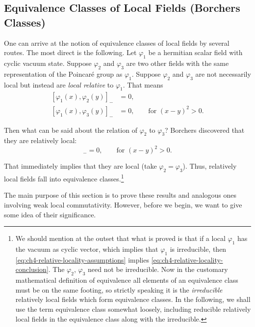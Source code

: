 \subsection{Equivalence Classes of Local Fields (Borchers Classes)}
\label{sec:ch4-6-borchers-classes}

One can arrive at the notion of equivalence classes of local fields by
several routes. The most direct is the following. Let $\varphi_1$ be a
hermitian scalar field with cyclic vacuum state. Suppose $\varphi_2$ and
$\varphi_3$ are two other fields with the same representation of the
Poincaré group as $\varphi_1$. Suppose $\varphi_2$ and $\varphi_3$ are not
necessarily local but instead are \emph{local relative} to $\varphi_1$. That
means
\begin{equation}
\begin{aligned}
  [\varphi_1(x),\varphi_2(y)]_-&=0,\\
  [\varphi_1(x),\varphi_3(y)]_-&=0,
  \qquad \text{for }(x-y)^2>0.
\end{aligned}
\tag{4-90}\label{eq:ch4-relative-locality-assumptions}
\end{equation}

Then what can be said about the relation of $\varphi_2$ to $\varphi_3$?
Borchers discovered that they are relatively local:
\begin{equation}
  [\varphi_2(x),\varphi_3(y)]_-=0,
  \qquad \text{for }(x-y)^2>0.
\tag{4-91}\label{eq:ch4-relative-locality-conclusion}
\end{equation}

That immediately implies that they are local (take $\varphi_2=\varphi_3$).
Thus, relatively local fields fall into equivalence classes.\footnote{%
We should mention at the outset that what is proved is that if a local
$\varphi_1$ has the vacuum as cyclic vector, which implies that $\varphi_1$
is irreducible, then \eqref{eq:ch4-relative-locality-assumptions} implies \eqref{eq:ch4-relative-locality-conclusion}. The $\varphi_2$, $\varphi_3$ need
not be irreducible. Now in the customary mathematical definition of
equivalence all elements of an equivalence class must be on the same footing,
so strictly speaking it is the \emph{irreducible} relatively local fields
which form equivalence classes. In the following, we shall use the term
equivalence class somewhat loosely, including reducible relatively local
fields in the equivalence class along with the irreducible.}

The main purpose of this section is to prove these results and analogous ones
involving weak local commutativity. However, before we begin, we want to give
some idea of their significance.

